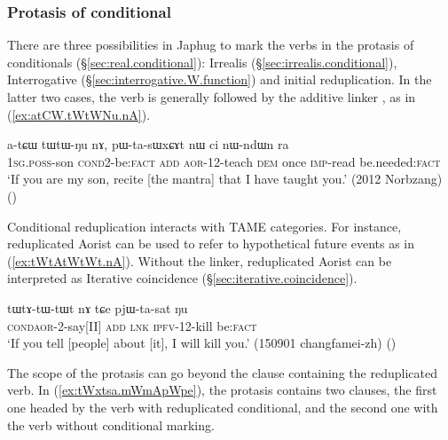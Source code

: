 \subsubsection{Protasis of conditional} \label{sec:redp.protasis}
There are three possibilities in Japhug to mark the verbs in the protasis of conditionals (§\ref{sec:real.conditional}): Irrealis (§\ref{sec:irrealis.conditional}), Interrogative  (§\ref{sec:interrogative.W.function}) and initial reduplication. In the latter two cases, the verb is generally followed by the additive linker , as in (\ref{ex:atCW.tWtWNu.nA}).
 
\begin{exe}
\ex \label{ex:atCW.tWtWNu.nA}
\gll   a-tɕɯ tɯ\redp{}tɯ-ŋu nɤ, pɯ-ta-sɯxɕɤt nɯ ci nɯ-ndɯn ra \\
\textsc{1sg}.\textsc{poss}-son \textsc{cond}\redp{}2-be:\textsc{fact} \textsc{add} \textsc{aor}-1\fl{}2-teach \textsc{dem} once \textsc{imp}-read be.needed:\textsc{fact} \\
\glt `If you are my son, recite [the mantra] that I have taught you.' (2012 Norbzang)
()
\end{exe}

Conditional reduplication interacts with TAME categories. For instance, reduplicated Aorist can be used to refer to hypothetical future events as in (\ref{ex:tWtAtWtWt.nA}). Without the  linker, reduplicated Aorist can be interpreted as Iterative coincidence (§\ref{sec:iterative.coincidence}).

\begin{exe}
\ex \label{ex:tWtAtWtWt.nA}
\gll tɯ\redp{}tɤ-tɯ-tɯt nɤ tɕe pjɯ-ta-sat ŋu \\
\textsc{cond}\redp{}\textsc{aor}-2-say[II] \textsc{add} \textsc{lnk} \textsc{ipfv}-1\fl{}2-kill be:\textsc{fact} \\
\glt `If you tell [people] about [it], I will kill you.' (150901 changfamei-zh) ()
\end{exe}

The scope of the protasis can go beyond the clause containing the reduplicated verb. In (\ref{ex:tWxtsa.mWmApWpe}), the protasis contains two clauses, the first one headed by the verb  with reduplicated conditional, and the second one with the verb  without conditional marking.

